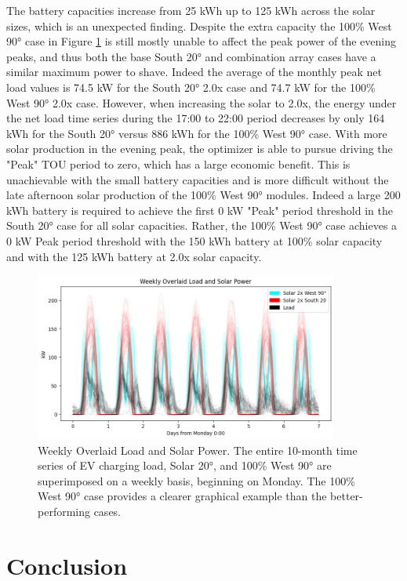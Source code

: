 \documentclass[journal,article,submit,pdftex,moreauthors]{Definitions/mdpi}
\begin{document}
The battery capacities increase from 25 kWh up to 125 kWh across the solar sizes, which is an unexpected finding. Despite the extra capacity the 100\% West 90° case in Figure \ref{fig:weekly-load-solar} is still mostly unable to affect the peak power of the evening peaks, and thus both the base South 20° and combination array cases have a similar maximum power to shave. Indeed the average of the monthly peak net load values is 74.5 kW for the South 20° 2.0x case and 74.7 kW for the 100\% West 90° 2.0x case. However, when increasing the solar to 2.0x, the energy under the net load time series during the 17:00 to 22:00 period decreases by only 164 kWh for the South 20° versus 886 kWh for the 100\% West 90° case. With more solar production in the evening peak, the optimizer is able to pursue driving the "Peak" TOU period to zero, which has a large economic benefit. This is unachievable with the small battery capacities and is more difficult without the late afternoon solar production of the 100\% West 90° modules. Indeed a large 200 kWh battery is required to achieve the first 0 kW "Peak" period threshold in the South 20° case for all solar capacities. Rather, the 100\% West 90° case achieves a 0 kW Peak period threshold with the 150 kWh battery at 100\% solar capacity and with the 125 kWh battery at 2.0x solar capacity.

\begin{figure}
  \centering
  \includegraphics[width=10cm]{./images/bifacial_peak_shaving_paper.assets/weekly load solar.png}
  \caption{Weekly Overlaid Load and Solar Power. The entire 10-month time series of EV charging load, Solar 20°, and 100\% West 90° are superimposed on a weekly basis, beginning on Monday. The 100\% West 90° case provides a clearer graphical example than the better-performing cases.}
  \label{fig:weekly-load-solar}
\end{figure}

\section{Conclusion}\label{conclusion}%
\end{document}
